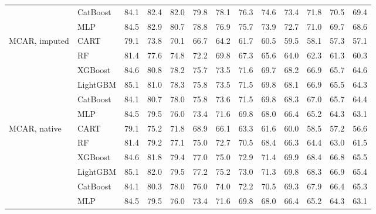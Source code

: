 \documentclass[pdflatex,sn-mathphys]{sn-jnl}
\theoremstyle{thmstyleone}
\begin{document}
\begin{table}[htbp]
\begin{tabular}{@{}llrrrrrrrrrrr@{}}
 & CatBoost & 84.1 & 82.4 & 82.0 & 79.8 & 78.1 & 76.3 & 74.6 & 73.4 & 71.8 & 70.5 & 69.4 \\
 & MLP & 84.5 & 82.9 & 80.7 & 78.8 & 76.9 & 75.7 & 73.9 & 72.7 & 71.0 & 69.7 & 68.6 \\
\midrule
MCAR, imputed & CART & 79.1 & 73.8 & 70.1 & 66.7 & 64.2 & 61.7 & 60.5 & 59.5 & 58.1 & 57.3 & 57.1 \\
 & RF & 81.4 & 77.6 & 74.8 & 72.2 & 69.8 & 67.3 & 65.6 & 64.0 & 62.3 & 61.3 & 60.3 \\
 & XGBoost & 84.6 & 80.8 & 78.2 & 75.7 & 73.5 & 71.6 & 69.7 & 68.2 & 66.9 & 65.7 & 64.6 \\
 & LightGBM & 85.1 & 81.0 & 78.3 & 75.8 & 73.5 & 71.5 & 69.8 & 68.1 & 66.9 & 65.5 & 64.3 \\
 & CatBoost & 84.1 & 80.7 & 78.0 & 75.8 & 73.6 & 71.5 & 69.8 & 68.3 & 67.0 & 65.7 & 64.4 \\
 & MLP & 84.5 & 79.5 & 76.0 & 73.4 & 71.6 & 69.8 & 68.0 & 66.4 & 65.2 & 64.3 & 63.1 \\
\midrule
MCAR, native & CART & 79.1 & 75.2 & 71.8 & 68.9 & 66.1 & 63.3 & 61.6 & 60.0 & 58.5 & 57.2 & 56.6 \\
 & RF & 81.4 & 79.2 & 77.1 & 75.0 & 72.7 & 70.5 & 68.4 & 66.3 & 64.4 & 63.0 & 61.5 \\
 & XGBoost & 84.6 & 81.8 & 79.4 & 77.0 & 75.0 & 72.9 & 71.4 & 69.9 & 68.4 & 66.8 & 65.5 \\
 & LightGBM & 85.1 & 82.0 & 79.5 & 77.2 & 75.2 & 73.0 & 71.3 & 69.8 & 68.3 & 66.9 & 65.4 \\
 & CatBoost & 84.1 & 80.3 & 78.0 & 76.0 & 74.0 & 72.2 & 70.5 & 69.3 & 67.9 & 66.4 & 65.3 \\
 & MLP & 84.5 & 79.5 & 76.0 & 73.4 & 71.6 & 69.8 & 68.0 & 66.4 & 65.2 & 64.3 & 63.1 \\
\bottomrule
\end{tabular}
\end{table}
\end{document}
